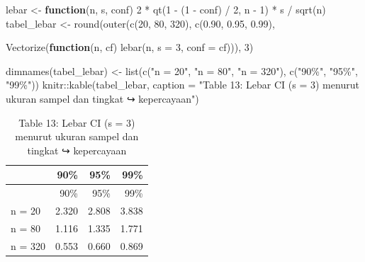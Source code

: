 \documentclass[
  indonesian,
  letterpaper,
]{book}
\newenvironment{Shaded}{\begin{snugshade}}{\end{snugshade}}
\newcommand{\AttributeTok}[1]{\textcolor[rgb]{0.40,0.45,0.13}{#1}}
\newcommand{\ControlFlowTok}[1]{\textcolor[rgb]{0.00,0.23,0.31}{\textbf{#1}}}
\newcommand{\DecValTok}[1]{\textcolor[rgb]{0.68,0.00,0.00}{#1}}
\newcommand{\FloatTok}[1]{\textcolor[rgb]{0.68,0.00,0.00}{#1}}
\newcommand{\FunctionTok}[1]{\textcolor[rgb]{0.28,0.35,0.67}{#1}}
\newcommand{\NormalTok}[1]{\textcolor[rgb]{0.00,0.23,0.31}{#1}}
\newcommand{\OtherTok}[1]{\textcolor[rgb]{0.00,0.23,0.31}{#1}}
\newcommand{\SpecialCharTok}[1]{\textcolor[rgb]{0.37,0.37,0.37}{#1}}
\newcommand{\StringTok}[1]{\textcolor[rgb]{0.13,0.47,0.30}{#1}}
\begin{document}
\begin{Shaded}
\begin{Highlighting}[]
\NormalTok{lebar }\OtherTok{\textless{}{-}} \ControlFlowTok{function}\NormalTok{(n, s, conf) }\DecValTok{2} \SpecialCharTok{*} \FunctionTok{qt}\NormalTok{(}\DecValTok{1} \SpecialCharTok{{-}}\NormalTok{ (}\DecValTok{1} \SpecialCharTok{{-}}\NormalTok{ conf) }\SpecialCharTok{/} \DecValTok{2}\NormalTok{, n }\SpecialCharTok{{-}} \DecValTok{1}\NormalTok{) }\SpecialCharTok{*}\NormalTok{ s }\SpecialCharTok{/} \FunctionTok{sqrt}\NormalTok{(n)}
\NormalTok{tabel\_lebar }\OtherTok{\textless{}{-}} \FunctionTok{round}\NormalTok{(}\FunctionTok{outer}\NormalTok{(}\FunctionTok{c}\NormalTok{(}\DecValTok{20}\NormalTok{, }\DecValTok{80}\NormalTok{, }\DecValTok{320}\NormalTok{), }\FunctionTok{c}\NormalTok{(}\FloatTok{0.90}\NormalTok{, }\FloatTok{0.95}\NormalTok{, }\FloatTok{0.99}\NormalTok{),}

\FunctionTok{Vectorize}\NormalTok{(}\ControlFlowTok{function}\NormalTok{(n, cf) }\FunctionTok{lebar}\NormalTok{(n, }\AttributeTok{s =} \DecValTok{3}\NormalTok{, }\AttributeTok{conf =}\NormalTok{ cf))),}
\DecValTok{3}\NormalTok{)}

\FunctionTok{dimnames}\NormalTok{(tabel\_lebar) }\OtherTok{\textless{}{-}} \FunctionTok{list}\NormalTok{(}\FunctionTok{c}\NormalTok{(}\StringTok{"n = 20"}\NormalTok{, }\StringTok{"n = 80"}\NormalTok{, }\StringTok{"n = 320"}\NormalTok{), }\FunctionTok{c}\NormalTok{(}\StringTok{"90\%"}\NormalTok{, }\StringTok{"95\%"}\NormalTok{,}
\StringTok{"99\%"}\NormalTok{))}
\NormalTok{knitr}\SpecialCharTok{::}\FunctionTok{kable}\NormalTok{(tabel\_lebar, }\AttributeTok{caption =} \StringTok{"Table 13: Lebar CI (s = 3) menurut ukuran sampel dan tingkat}
\StringTok{↪ kepercayaan"}\NormalTok{)}
\end{Highlighting}
\end{Shaded}

\begin{longtable}[]{@{}lrrr@{}}
\caption{Table 13: Lebar CI (s = 3) menurut ukuran sampel dan tingkat ↪
kepercayaan}\tabularnewline
\toprule\noalign{}
& 90\% & 95\% & 99\% \\
\midrule\noalign{}
\endfirsthead
\toprule\noalign{}
& 90\% & 95\% & 99\% \\
\midrule\noalign{}
\endhead
\bottomrule\noalign{}
\endlastfoot
n = 20 & 2.320 & 2.808 & 3.838 \\
n = 80 & 1.116 & 1.335 & 1.771 \\
n = 320 & 0.553 & 0.660 & 0.869 \\
\end{longtable}
\end{document}
